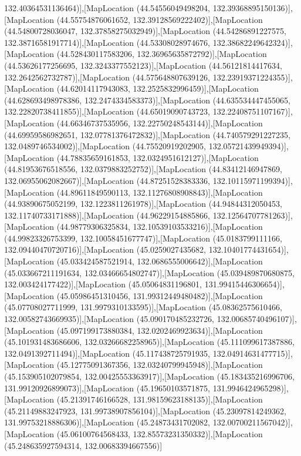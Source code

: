 132.40364531136464)],[MapLocation (44.54556049498204, 132.39368895150136)],[MapLocation (44.55754876061652, 132.39128569222402)],[MapLocation (44.54800728036047, 132.37858275032949)],[MapLocation (44.54286891227575, 132.38716581917714)],[MapLocation (44.53308028974676, 132.38682249642324)],[MapLocation (44.528430117583206, 132.36965635872792)],[MapLocation (44.53626177256695, 132.3243377552123)],[MapLocation (44.56121814417634, 132.2642562732787)],[MapLocation (44.575648807639126, 132.23919371224355)],[MapLocation (44.62014117943083, 132.2525832996459)],[MapLocation (44.628693498978386, 132.2474334583373)],[MapLocation (44.635534447455065, 132.22820738411855)],[MapLocation (44.65019090743723, 132.22408751107167)],[MapLocation (44.66346737535956, 132.22750248543144)],[MapLocation (44.69959586982651, 132.07781376472832)],[MapLocation (44.740579291227235, 132.0489746534002)],[MapLocation (44.75520919202905, 132.05721439949394)],[MapLocation (44.78835659161853, 132.0324951612127)],[MapLocation (44.81953676518556, 132.0379883252752)],[MapLocation (44.83412146947869, 132.06955062082667)],[MapLocation (44.87251528383336, 132.10115971199394)],[MapLocation (44.89611849590113, 132.11276808908843)],[MapLocation (44.93890675052199, 132.1223811261978)],[MapLocation (44.94844312050453, 132.11740733171888)],[MapLocation (44.96229154885866, 132.12564707781263)],[MapLocation (44.98779306325834, 132.10539103533216)],[MapLocation (44.99823326753399, 132.10058451677747)],[MapLocation (45.0183799111166, 132.09440470720716)],[MapLocation (45.0259027435682, 132.10401774431654)],[MapLocation (45.033424587521914, 132.0686555006642)],[MapLocation (45.033667211191634, 132.03466654802747)],[MapLocation (45.039489870680875, 132.003424177422)],[MapLocation (45.05064831196801, 131.99415446306654)],[MapLocation (45.05986451310456, 131.99312449480482)],[MapLocation (45.07708027711999, 131.9979310133595)],[MapLocation (45.08362575610466, 132.00582743669935)],[MapLocation (45.090170485232726, 132.00685740496107)],[MapLocation (45.097199173880384, 132.0202469923634)],[MapLocation (45.101931483686606, 132.03266682258965)],[MapLocation (45.111099617387886, 132.0491392711494)],[MapLocation (45.117438725791935, 132.04914631477715)],[MapLocation (45.12775091367356, 132.03240799945948)],[MapLocation (45.153905102079854, 132.00425553363917)],[MapLocation (45.183435216996706, 131.99120926899073)],[MapLocation (45.19650103571875, 131.9946424965298)],[MapLocation (45.21391746166528, 131.98159623188135)],[MapLocation (45.21149883247923, 131.99738907856104)],[MapLocation (45.23097814249362, 131.99753218886306)],[MapLocation (45.24873431702082, 132.00700211567042)],[MapLocation (45.06100764568433, 132.85573231350332)],[MapLocation (45.248635927594314, 132.00683394667556)]